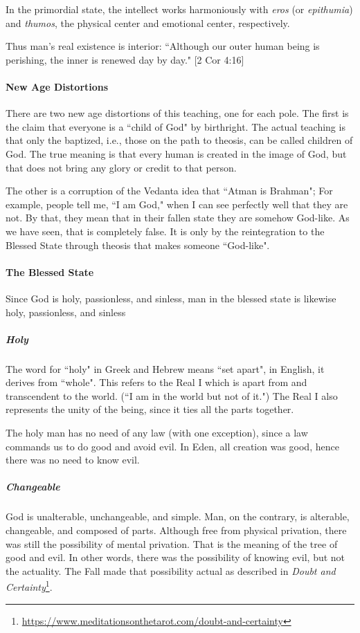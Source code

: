 In the primordial state, the intellect works harmoniously with \emph{eros} (or \emph{epithumia}) and \emph{thumos}, the physical center and emotional center, respectively.

Thus man's real existence is interior: ``Although our outer human being is perishing, the inner is renewed day by day." [2 Cor 4:16]

\paragraph{New Age Distortions}
There are two new age distortions of this teaching, one for each pole. The first is the claim that everyone is a ``child of God" by birthright. The actual teaching is that only the baptized, i.e., those on the path to theosis, can be called children of God. The true meaning is that every human is created in the image of God, but that does not bring any glory or credit to that person.

The other is a corruption of the Vedanta idea that ``Atman is Brahman"; For example, people tell me, ``I am God," when I can see perfectly well that they are not. By that, they mean that in their fallen state they are somehow God-like. As we have seen, that is completely false. It is only by the reintegration to the Blessed State through theosis that makes someone ``God-like".

\paragraph{The Blessed State}
Since God is holy, passionless, and sinless, man in the blessed state is likewise holy, passionless, and sinless

\subparagraph{Holy}
The word for ``holy" in Greek and Hebrew means ``set apart", in English, it derives from ``whole". This refers to the Real I which is apart from and transcendent to the world. (``I am in the world but not of it.") The Real I also represents the unity of the being, since it ties all the parts together.

The holy man has no need of any law (with one exception), since a law commands us to do good and avoid evil. In Eden, all creation was good, hence there was no need to know evil.

\subparagraph{Changeable}
God is unalterable, unchangeable, and simple. Man, on the contrary, is alterable, changeable, and composed of parts. Although free from physical privation, there was still the possibility of mental privation. That is the meaning of the tree of good and evil. In other words, there was the possibility of knowing evil, but not the actuality. The Fall made that possibility actual as described in \textit{Doubt and Certainty}\footnote{\url{https://www.meditationsonthetarot.com/doubt-and-certainty}}.

